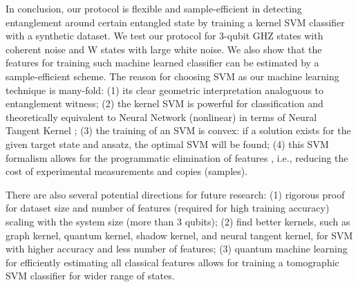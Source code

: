 \documentclass[
aps,
pra,
twocolumn,
floatfix,
]{revtex4-2}
\theoremstyle{plain}
\theoremstyle{definition}
\begin{document}
In conclusion,
our protocol is flexible and sample-efficient in detecting entanglement around certain entangled state by training a kernel SVM classifier with a synthetic dataset.
We test our protocol for 3-qubit GHZ states with coherent noise and W states with large white noise.
We also show that the features for training such machine learned classifier can be estimated by a sample-efficient scheme.
The reason for choosing SVM as our machine learning technique is many-fold:
(1) its clear geometric interpretation analoguous to entanglement witness;
(2) the kernel SVM is powerful for classification and theoretically equivalent to Neural Network (nonlinear) in terms of Neural Tangent Kernel \cite{jacotNeuralTangentKernel2020};
(3) the training of an SVM is convex: if a solution exists for the given target state and ansatz, the optimal SVM will be found;
(4) this SVM formalism allows for the programmatic elimination of features \cite{guyonGeneSelectionCancer2002}, i.e., reducing the cost of experimental measurements and copies (samples). 

There are also several potential directions for future research:
(1) rigorous proof for dataset size and number of features (required for high training accuracy) scaling with the system size (more than 3 qubits);
(2) find better kernels, such as graph kernel, quantum kernel, shadow kernel, and neural tangent kernel, for SVM with higher accuracy and less number of features;
(3) quantum machine learning for efficiently estimating all classical features allows for training a tomographic SVM classifier for wider range of states.
\end{document}

